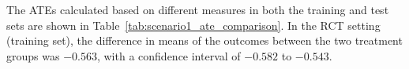 The ATEs calculated based on different measures in both the training and test sets are shown in Table~\ref{tab:scenario1_ate_comparison}. In the RCT setting (training set), the difference in means of the outcomes between the two treatment groups was 
$-0.563$, with a confidence interval of 
$-0.582$ to 
$-0.543$. 



% 



